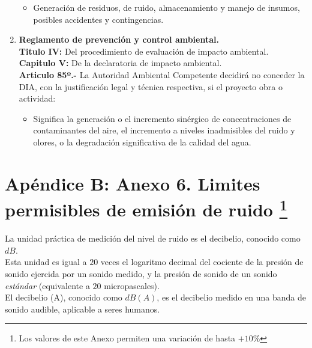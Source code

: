 \documentclass[letter,11pt]{article}
\begin{document}
\begin{enumerate}
\begin{itemize}
\item Generación de residuos, de ruido, almacenamiento y manejo de insumos,
posibles accidentes y contingencias.
\end{itemize}

\item
\textbf{Reglamento de prevención y control ambiental.} \\
\textbf{Titulo IV:} Del procedimiento de evaluación de impacto ambiental. \\
\textbf{Capitulo V:} De la declaratoria de impacto ambiental. \\
\textbf{Articulo 85º.-} La Autoridad Ambiental Competente decidirá no conceder
la DIA, con la justificación legal y técnica respectiva, si el proyecto obra o
actividad:

\begin{itemize}
\item Significa la generación o el incremento sinérgico de concentraciones de
contaminantes del aire, el incremento a niveles inadmisibles del ruido y olores,
o la degradación significativa de la calidad del agua.
\end{itemize}

\end{enumerate}

\newpage
\section*{Apéndice B: Anexo 6. Limites permisibles de emisión de ruido
\footnote{Los valores de este Anexo permiten una variación de hasta $+10\%$}}

La unidad práctica de medición del nivel de ruido es el decibelio, conocido como
$dB$. \\

Esta unidad es igual a $20$ veces el logaritmo decimal del cociente de la
presión de sonido ejercida por un sonido medido, y la presión de sonido de un
sonido \emph{estándar} (equivalente a $20$ micropascales). \\

El decibelio (A), conocido como $dB(A)$, es el decibelio medido en una banda de
sonido audible, aplicable a seres humanos. \\
\end{document}

